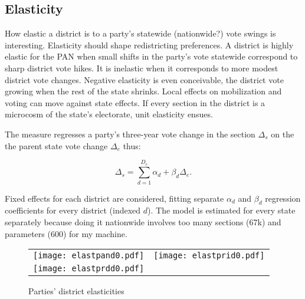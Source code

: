 \documentclass[letter,12pt]{article}
\begin{document}
\subsection*{Elasticity}


How elastic a district is to a party's statewide (nationwide?) vote swings is interesting. Elasticity should shape redistricting preferences. A district is highly elastic for the PAN when small shifts in the party's vote statewide correspond to sharp district vote hikes. It is inelastic when it corresponds to more modest district vote changes. Negative elasticity is even conceivable, the district vote growing when the rest of the state shrinks. Local effects on mobilization and voting can move against state effects. If every section in the district is a microcosm of the state's electorate, unit elasticity ensues. 

The measure regresses a party's three-year vote change in the section $\Delta_s$ on the the parent state vote change $\Delta_e$ thus:  

\begin{equation}
\Delta_s = \sum\limits_{d=1}^{D_e} \alpha_d + \beta_d \Delta_e.
\end{equation}

\noindent Fixed effects for each district are considered, fitting separate $\alpha_d$ and $\beta_d$ regression coefficients for every district (indexed $d$). The model is estimated for every state separately because doing it nationwide involves too many sections (67k) and parameters (600) for my machine. 

\begin{figure}
\begin{center}
  \begin{tabular}{cc}
    \texttt{[image: elastpand0.pdf]} & \texttt{[image: elastprid0.pdf]} \\
    \texttt{[image: elastprdd0.pdf]} &  \\
  \end{tabular}
  \caption{Parties' district elasticities}\label{F:malmgnat}
\end{center}
\end{figure}





%
\end{document}

